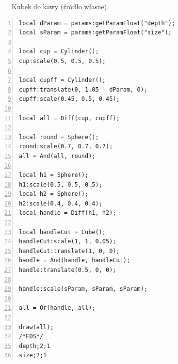 \begin{figure}[h!]
  \centering
  \qquad
  \caption{Kubek do kawy (źródło własne).}
\end{figure}
{
\small
\begin{lstlisting}[numbers=left,frame=single,numberstyle=\tiny,backgroundcolor=\color{code_back},breaklines=true]
local dParam = params:getParamFloat("depth");
local sParam = params:getParamFloat("size");

local cup = Cylinder();
cup:scale(0.5, 0.5, 0.5);

local cupff = Cylinder();
cupff:translate(0, 1.05 - dParam, 0);
cupff:scale(0.45, 0.5, 0.45);

local all = Diff(cup, cupff);

local round = Sphere();
round:scale(0.7, 0.7, 0.7);
all = And(all, round);

local h1 = Sphere();
h1:scale(0.5, 0.5, 0.5);
local h2 = Sphere();
h2:scale(0.4, 0.4, 0.4);
local handle = Diff(h1, h2);

local handleCut = Cube();
handleCut:scale(1, 1, 0.05);
handleCut:translate(1, 0, 0);
handle = And(handle, handleCut);
handle:translate(0.5, 0, 0);

handle:scale(sParam, sParam, sParam);

all = Or(handle, all);

draw(all);
/*EOS*/
depth;2;1
size;2;1
\end{lstlisting}
}

